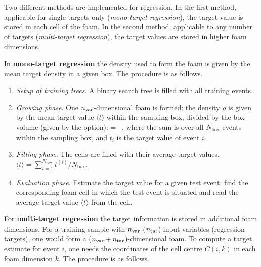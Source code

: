 Two different methods are implemented for regression. In the first method,
applicable for single targets only ({\em mono-target regression}), the target
value is stored in each cell of the foam. In the second method, applicable 
to any number of targets ({\em multi-target regression}), the target 
values are stored in higher foam dimensions. 

In {\bf mono-target regression} the density used to form the foam is given by
the mean target density in a given box. The procedure is as follows. 

\begin{enumerate}
  \item \emph{Setup of training trees}. A binary search tree is filled
        with all training events.

  \item \emph{Growing phase}. One ${n_\text{var}}$-dimensional foam is
        formed: the density $\rho$ is given by the mean target value
        $\langle t\rangle$ within the sampling box, divided by the box
        volume (given by the  option):
	\beq
        \rho =  \equiv
         \, , 
	\eeq 
	where the sum is over all $N_\text{box}$ events within the
        sampling box, and $t_i$ is the target value of event $i$.

  \item \emph{Filling phase}. The cells are filled with their
        average target values, $\langle t\rangle =
        \sum_{i=1}^{N_\text{box}}t^{(i)}/N_\text{box}$.

  \item \emph{Evaluation phase}. Estimate the target value for a
        given test event: find the corresponding foam cell in which
        the test event is situated and read the average target value
        $\langle t\rangle$ from the cell.
\end{enumerate}

For {\bf multi-target regression} the target information is stored in additional 
foam dimensions. For a training sample with ${n_\text{var}}$ (${n_\text{tar}}$) input variables 
(regression targets), one would form a (${n_\text{var}}+{n_\text{tar}}$)-dimensional foam.
To compute a target estimate for event $i$, one needs the coordinates of 
the cell centre $C(i, k)$ in each foam dimension $k$. The procedure is 
as follows.

